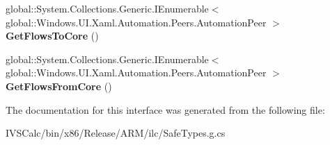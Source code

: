 \begin{DoxyCompactItemize}
global\+::\+System.\+Collections.\+Generic.\+I\+Enumerable$<$ global\+::\+Windows.\+U\+I.\+Xaml.\+Automation.\+Peers.\+Automation\+Peer $>$ {\bfseries Get\+Flows\+To\+Core} ()
\item 
\mbox{\label{interface_windows_1_1_u_i_1_1_xaml_1_1_automation_1_1_peers_1_1_i_automation_peer_overrides5_ad5034fd0fa56bd30ad0fdaf85f6eff9c}} 
global\+::\+System.\+Collections.\+Generic.\+I\+Enumerable$<$ global\+::\+Windows.\+U\+I.\+Xaml.\+Automation.\+Peers.\+Automation\+Peer $>$ {\bfseries Get\+Flows\+From\+Core} ()
\end{DoxyCompactItemize}


The documentation for this interface was generated from the following file\+:\begin{DoxyCompactItemize}
\item 
I\+V\+S\+Calc/bin/x86/\+Release/\+A\+R\+M/ilc/Safe\+Types.\+g.\+cs\end{DoxyCompactItemize}
